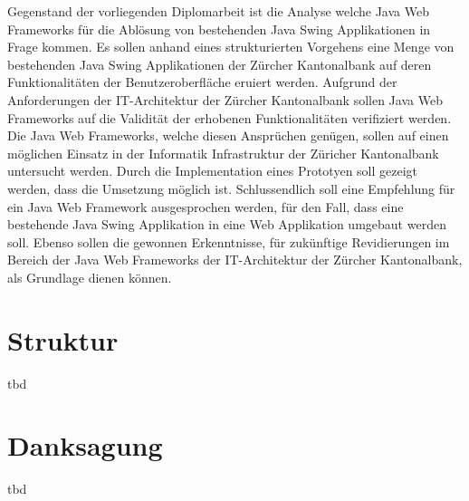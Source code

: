   Gegenstand der vorliegenden Diplomarbeit ist die Analyse welche Java Web
  Frameworks für die Ablösung von bestehenden Java Swing Applikationen in Frage
  kommen. Es sollen anhand eines strukturierten Vorgehens eine Menge von
  bestehenden Java Swing Applikationen der Zürcher Kantonalbank auf deren
  Funktionalitäten der Benutzeroberfläche eruiert werden. Aufgrund der
  Anforderungen der IT-Architektur der Zürcher Kantonalbank sollen Java Web
  Frameworks auf die Validität der erhobenen Funktionalitäten verifiziert
  werden. Die Java Web Frameworks, welche diesen Ansprüchen genügen, sollen auf
  einen möglichen Einsatz in der Informatik Infrastruktur der Züricher
  Kantonalbank untersucht werden. Durch die Implementation eines Prototyen soll
  gezeigt werden, dass die Umsetzung möglich ist. Schlussendlich soll eine
  Empfehlung für ein Java Web Framework ausgesprochen werden, für den Fall,
  dass eine bestehende Java Swing Applikation in eine Web Applikation umgebaut
  werden soll. Ebenso sollen die gewonnen Erkenntnisse, für zukünftige
  Revidierungen im Bereich der Java Web Frameworks der IT-Architektur der
  Zürcher Kantonalbank, als Grundlage dienen können.
  
  \section{Struktur}
  
  tbd
  
  \section{Danksagung}
  
  tbd
  